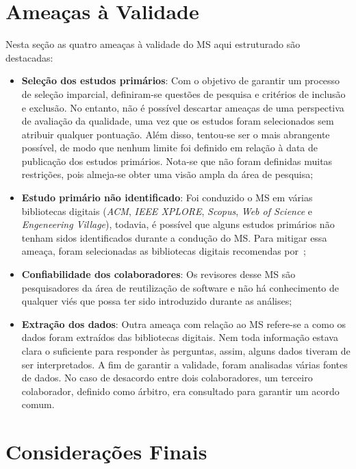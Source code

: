 \section{Ameaças à Validade}\label{subsec:ameaças_a_validade}
Nesta seção as quatro ameaças à validade do MS aqui estruturado são destacadas:

\begin{itemize}
\item \textbf{Seleção dos estudos primários}: Com o objetivo de garantir um processo de seleção imparcial, definiram-se questões de pesquisa e critérios de inclusão e exclusão.
No entanto, não é possível descartar ameaças de uma perspectiva de avaliação da qualidade, uma vez que os estudos foram selecionados sem atribuir qualquer pontuação. Além disso, tentou-se ser o mais abrangente possível, de modo que nenhum limite foi definido em relação à data de publicação dos estudos primários. Nota-se que não foram definidas muitas restrições, pois almeja-se obter uma visão ampla da área de pesquisa;

\item \textbf{Estudo primário não identificado}: Foi conduzido o MS em várias bibliotecas digitais (\textit{ACM}, \textit{IEEE XPLORE}, \textit{Scopus}, \textit{Web of Science} e \textit{Engeneering Village}), todavia, é possível que alguns estudos primários não tenham sidos identificados durante a condução do MS. Para mitigar essa ameaça, foram selecionadas as bibliotecas digitais recomendas por~;

\item \textbf{Confiabilidade dos colaboradores}: Os revisores desse MS são pesquisadores da área de reutilização de software e não há conhecimento de qualquer viés que possa ter sido introduzido durante as análises;

\item \textbf{Extração dos dados}: Outra ameaça com relação ao MS refere-se a como os dados foram extraídos das bibliotecas digitais. Nem toda informação estava clara o suficiente para responder às perguntas, assim, alguns dados tiveram de ser interpretados.
A fim de garantir a validade, foram analisadas várias fontes de dados. No caso de desacordo entre dois colaboradores, um terceiro colaborador, definido como árbitro, era consultado para garantir um acordo comum.

\end{itemize}


\section{Considerações Finais}\label{sec:considerações_finais_do_mapeamento_sistematico}

